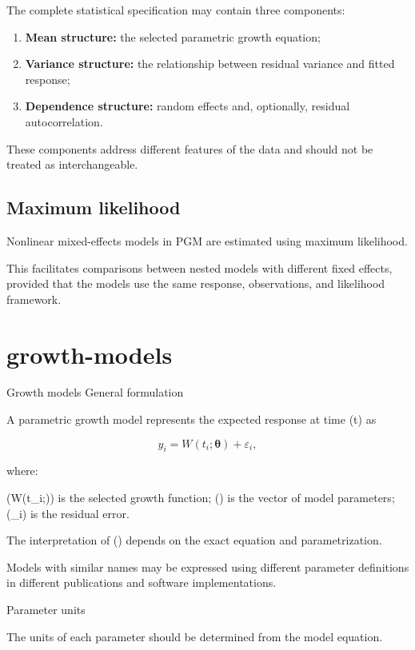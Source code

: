 \documentclass[
  english,
  letterpaper,
  DIV=11,
  numbers=noendperiod]{scrreprt}
\providecommand{\tightlist}{%
  \setlength{\itemsep}{0pt}\setlength{\parskip}{0pt}}
\begin{document}
The complete statistical specification may contain three components:

\begin{enumerate}
\def\labelenumi{\arabic{enumi}.}
\tightlist
\item
  \textbf{Mean structure:} the selected parametric growth equation;
\item
  \textbf{Variance structure:} the relationship between residual
  variance and fitted response;
\item
  \textbf{Dependence structure:} random effects and, optionally,
  residual autocorrelation.
\end{enumerate}

These components address different features of the data and should not
be treated as interchangeable.

\section{Maximum likelihood}\label{maximum-likelihood}

Nonlinear mixed-effects models in PGM are estimated using maximum
likelihood.

This facilitates comparisons between nested models with different fixed
effects, provided that the models use the same response, observations,
and likelihood framework.

\chapter{growth-models}\label{growth-models}

Growth models General formulation

A parametric growth model represents the expected response at time (t)
as

\[
y_i = W(t_i;\boldsymbol\theta) + \varepsilon_i,
\]

where:

(W(t\_i;\boldsymbol\theta)) is the selected growth function;
(\boldsymbol\theta) is the vector of model parameters; (\varepsilon\_i)
is the residual error.

The interpretation of (\boldsymbol\theta) depends on the exact equation
and parametrization.

Models with similar names may be expressed using different parameter
definitions in different publications and software implementations.

Parameter units

The units of each parameter should be determined from the model
equation.
\end{document}
